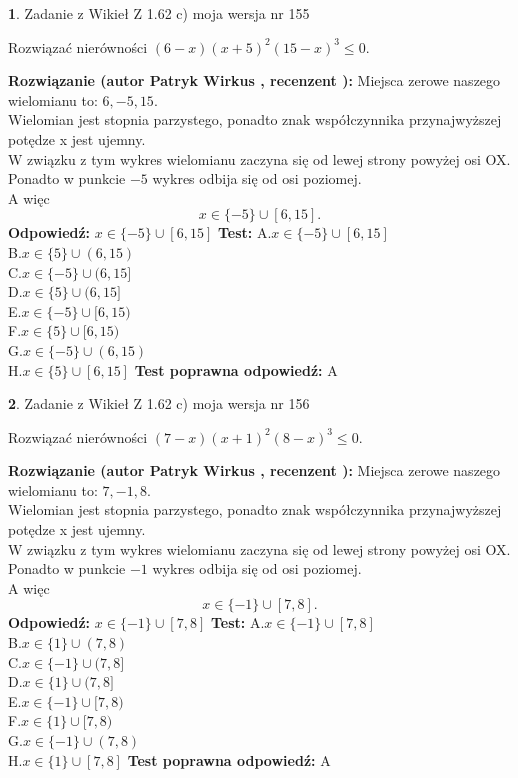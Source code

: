 \documentclass[12pt, a4paper]{article}
\theoremstyle{definition} %
\newtheorem{zad}{}
\newcommand{\zadStart}[1]{\begin{zad}#1\newline}
\newcommand{\zadStop}{\end{zad}}
\newcommand{\rozwStart}[2]{\noindent \textbf{Rozwiązanie (autor #1 , recenzent #2): }\newline}
\newcommand{\rozwStop}{\newline}
\newcommand{\odpStart}{\noindent \textbf{Odpowiedź:}\newline}
\newcommand{\odpStop}{\newline}
\newcommand{\testStart}{\noindent \textbf{Test:}\newline}
\newcommand{\testStop}{\newline}
\newcommand{\kluczStart}{\noindent \textbf{Test poprawna odpowiedź:}\newline}
\newcommand{\kluczStop}{\newline}
\begin{document}
\zadStart{Zadanie z Wikieł Z 1.62 c) moja wersja nr 155}

Rozwiązać nierówności $(6-x)(x+5)^{2}(15-x)^{3}\le0$.
\zadStop
\rozwStart{Patryk Wirkus}{}
Miejsca zerowe naszego wielomianu to: $6, -5, 15$.\\
Wielomian jest stopnia parzystego, ponadto znak współczynnika przy\linebreak najwyższej potędze x jest ujemny.\\ W związku z tym wykres wielomianu zaczyna się od lewej strony powyżej osi OX.\\
Ponadto w punkcie $-5$ wykres odbija się od osi poziomej.\\
A więc $$x \in \{-5\} \cup [6,15].$$
\rozwStop
\odpStart
$x \in \{-5\} \cup [6,15]$
\odpStop
\testStart
A.$x \in \{-5\} \cup [6,15]$\\
B.$x \in \{5\} \cup (6,15)$\\
C.$x \in \{-5\} \cup (6,15]$\\
D.$x \in \{5\} \cup (6,15]$\\
E.$x \in \{-5\} \cup [6,15)$\\
F.$x \in \{5\} \cup [6,15)$\\
G.$x \in \{-5\} \cup (6,15)$\\
H.$x \in \{5\} \cup [6,15]$
\testStop
\kluczStart
A
\kluczStop



\zadStart{Zadanie z Wikieł Z 1.62 c) moja wersja nr 156}

Rozwiązać nierówności $(7-x)(x+1)^{2}(8-x)^{3}\le0$.
\zadStop
\rozwStart{Patryk Wirkus}{}
Miejsca zerowe naszego wielomianu to: $7, -1, 8$.\\
Wielomian jest stopnia parzystego, ponadto znak współczynnika przy\linebreak najwyższej potędze x jest ujemny.\\ W związku z tym wykres wielomianu zaczyna się od lewej strony powyżej osi OX.\\
Ponadto w punkcie $-1$ wykres odbija się od osi poziomej.\\
A więc $$x \in \{-1\} \cup [7,8].$$
\rozwStop
\odpStart
$x \in \{-1\} \cup [7,8]$
\odpStop
\testStart
A.$x \in \{-1\} \cup [7,8]$\\
B.$x \in \{1\} \cup (7,8)$\\
C.$x \in \{-1\} \cup (7,8]$\\
D.$x \in \{1\} \cup (7,8]$\\
E.$x \in \{-1\} \cup [7,8)$\\
F.$x \in \{1\} \cup [7,8)$\\
G.$x \in \{-1\} \cup (7,8)$\\
H.$x \in \{1\} \cup [7,8]$
\testStop
\kluczStart
A
\kluczStop
\end{document}
